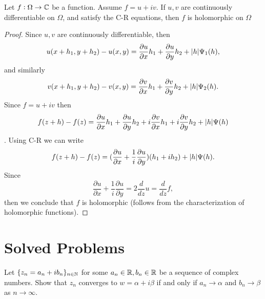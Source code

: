 \begin{theorem}
	Let $ f: \Omega \to \mathbb{C} $ be a function. Assume $ f = u + iv $. If $ u,v $ are continuously differentiable on $ \Omega $, and satisfy the C-R equations, then $ f $ is holomorphic on $ \Omega $
\end{theorem}
\begin{proof}
	Since $ u,v $ are continuously differentiable, then
	\[ u(x+h_1,y+h_2) - u(x,y) = \frac{\partial u}{\partial x} h_1 + \frac{\partial u}{\partial y} h_2 + |h|\Psi_1(h), \]
	and similarly
	\[ v(x+h_1, y+h_2) - v(x,y) = \frac{\partial v}{\partial x} h_1 + \frac{\partial v}{\partial y} h_2 + |h|\Psi_2(h). \]
	Since $ f = u + iv $ then
	\[ f(z+h) - f(z) = \frac{\partial u}{\partial x} h_1 + \frac{\partial u}{\partial y}h_2 + i \frac{\partial v}{\partial x}h_1 + i\frac{\partial v}{\partial y}h_2 + |h|\Psi(h)\].
	Using C-R we can write
	\[ f(z+h) - f(z) = (\frac{\partial u}{\partial x} + \frac{1}{i}\frac{\partial u}{\partial y})(h_1+ih_2) + |h|\Psi(h). \]
	Since 
	\[ \frac{\partial u}{\partial x} + \frac{1}{i}\frac{\partial u}{\partial y} = 2 \frac{d}{dz} u = \frac{d}{dz}f, \]
	then we conclude that $ f $ is holomorphic (follows from the characterization of holomorphic functions).
\end{proof}


\newpage

\section{Solved Problems}

\begin{problem}
	Let $ \{z_n = a_n + i b_n\}_{n\in\mathbb{N}} $ for some $ a_n \in \mathbb{R}, b_n \in \mathbb{R} $  be a sequence of complex numbers. Show that $ z_n $ converges to $ w = \alpha + i\beta $ if and only if $ a_n \to \alpha $ and $ b_n \to \beta $ as $ n\to \infty $.
\end{problem}

